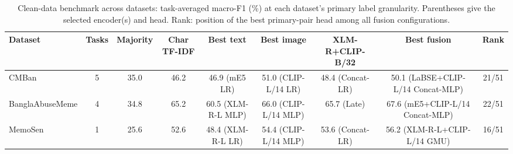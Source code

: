 \begin{table}[t]
\centering
\small
\caption{Clean-data benchmark across datasets: task-averaged macro-F1 (\%) at each dataset's primary label granularity. Parentheses give the selected encoder(s) and head. Rank: position of the best primary-pair head among all fusion configurations.}
\label{tab:cross_bench}
\begin{adjustbox}{max width=\textwidth}
\begin{tabular}{lcccccccc}
\toprule
Dataset & Tasks & Majority & Char TF-IDF & Best text & Best image & XLM-R+CLIP-B/32 & Best fusion & Rank \\
\midrule
CMBan & 5 & 35.0 & 46.2 & 46.9 (mE5 LR) & 51.0 (CLIP-L/14 LR) & 48.4 (Concat-LR) & 50.1 (LaBSE+CLIP-L/14 Concat-MLP) & 21/51 \\
BanglaAbuseMeme & 4 & 34.8 & 65.2 & 60.5 (XLM-R-L MLP) & 66.0 (CLIP-L/14 MLP) & 65.7 (Late) & 67.6 (mE5+CLIP-L/14 Concat-MLP) & 22/51 \\
MemoSen & 1 & 25.6 & 52.6 & 48.4 (XLM-R-L LR) & 54.4 (CLIP-L/14 MLP) & 53.6 (Concat-LR) & 56.2 (XLM-R-L+CLIP-L/14 GMU) & 16/51 \\
\bottomrule
\end{tabular}
\end{adjustbox}
\end{table}
